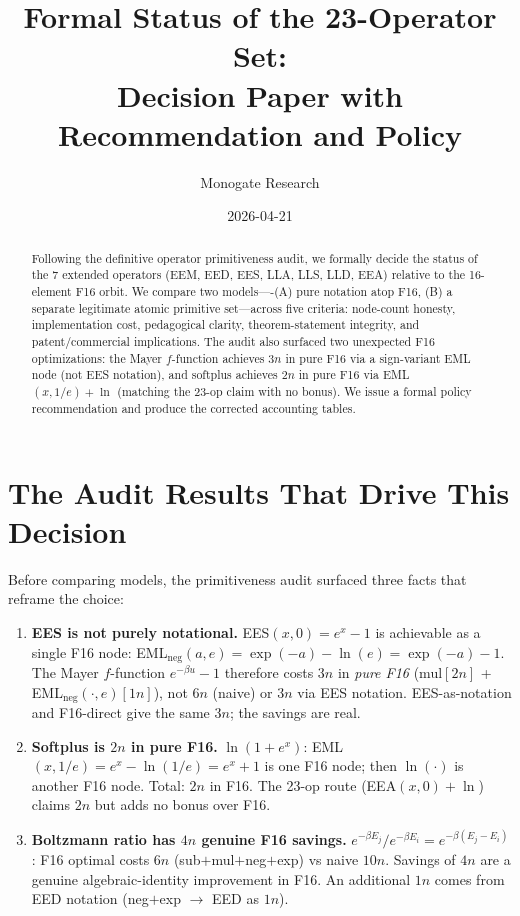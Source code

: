 \documentclass[11pt]{article}
\title{Formal Status of the 23-Operator Set:\\
Decision Paper with Recommendation and Policy}
\author{Monogate Research}
\date{2026-04-21}
\begin{document}
\maketitle

\begin{abstract}
Following the definitive operator primitiveness audit, we formally decide the status of
the 7 extended operators (EEM, EED, EES, LLA, LLS, LLD, EEA) relative to the 16-element
F16 orbit.
We compare two models----(A) pure notation atop F16, (B) a separate legitimate atomic
primitive set---across five criteria: node-count honesty, implementation cost, pedagogical
clarity, theorem-statement integrity, and patent/commercial implications.
The audit also surfaced two unexpected F16 optimizations: the Mayer $f$-function
achieves $3n$ in pure F16 via a sign-variant EML node (not EES notation), and softplus
achieves $2n$ in pure F16 via EML$(x,1/e)+\ln$ (matching the 23-op claim with no bonus).
We issue a formal policy recommendation and produce the corrected accounting tables.
\end{abstract}

\section{The Audit Results That Drive This Decision}

Before comparing models, the primitiveness audit surfaced three facts that reframe the choice:

\begin{enumerate}
  \item \textbf{EES is not purely notational.}
    EES$(x,0)=e^x-1$ is achievable as a single F16 node:
    EML$_{\mathrm{neg}}(a,e) = \exp(-a)-\ln(e)=\exp(-a)-1$.
    The Mayer $f$-function $e^{-\beta u}-1$ therefore costs $3n$ in \emph{pure F16}
    (mul$[2n]$ + EML$_{\mathrm{neg}}(\cdot,e)[1n]$), not $6n$ (naive) or $3n$ via EES notation.
    EES-as-notation and F16-direct give the same $3n$; the savings are real.

  \item \textbf{Softplus is $2n$ in pure F16.}
    $\ln(1+e^x)$: EML$(x,1/e)=e^x-\ln(1/e)=e^x+1$ is one F16 node;
    then $\ln(\cdot)$ is another F16 node. Total: $2n$ in F16.
    The 23-op route (EEA$(x,0)+\ln$) claims $2n$ but adds no bonus over F16.

  \item \textbf{Boltzmann ratio has $4n$ genuine F16 savings.}
    $e^{-\beta E_j}/e^{-\beta E_i}=e^{-\beta(E_j-E_i)}$:
    F16 optimal costs $6n$ (sub$+$mul$+$neg$+$exp) vs naive $10n$.
    Savings of $4n$ are a genuine algebraic-identity improvement in F16.
    An additional $1n$ comes from EED notation (neg$+$exp $\to$ EED as $1n$).
\end{enumerate}
\end{document}
